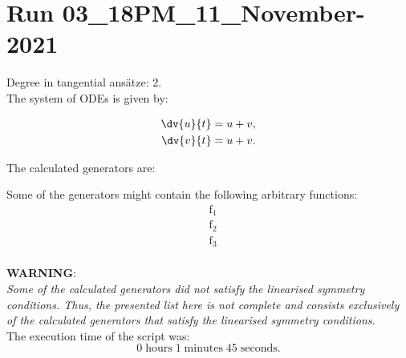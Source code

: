 \section*{Run 03\_18PM\_11\_November-2021}
Degree in tangential ansätze:	2.\\
The system of ODEs is given by:

\begin{align*}
\dv{u}{t}&=u + v,\\
\dv{v}{t}&=u + v.\\
\end{align*}

\noindent The calculated generators are:



\noindent Some of the generators might contain the following arbitrary functions:
\begin{align*}
&\operatorname{f_{1}}\\
&\operatorname{f_{2}}\\
&\operatorname{f_{3}}\\
\end{align*}

\noindent\huge\textbf{WARNING}:\\
\noindent\Large\textit{Some of the calculated generators did not satisfy the linearised symmetry conditions. Thus, the presented list here is not complete and consists exclusively of the calculated generators that satisfy the linearised symmetry conditions.}\normalsize\\[2cm]
\noindent The execution time of the script was:
$$0\;\mathrm{hours}\;1\;\mathrm{minutes}\;45 \;\mathrm{seconds}.$$
